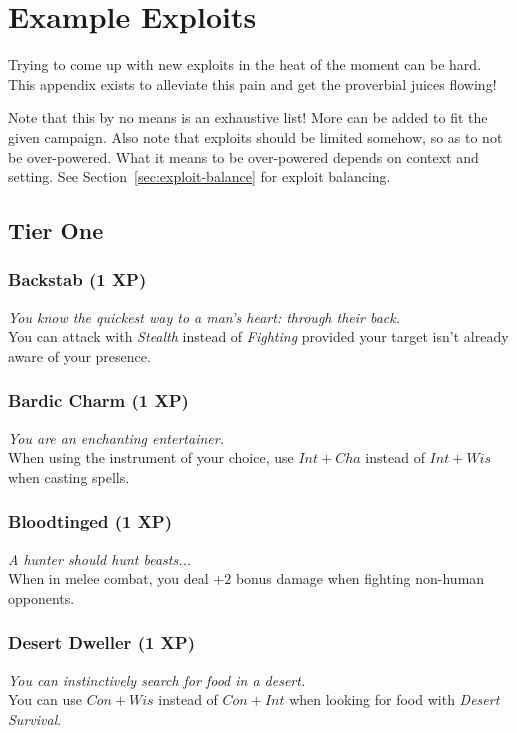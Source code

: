 \chapter{Example Exploits}\label{app:exploits}
Trying to come up with new exploits in the heat of the moment can be hard.
This appendix exists to alleviate this pain and get the proverbial juices flowing!

Note that this by no means is an exhaustive list!
More can be added to fit the given campaign.
Also note that exploits should be limited somehow, so as to not be over-powered. What it means to be over-powered depends on context and setting. See Section~\ref{sec:exploit-balance} for exploit balancing.

\section{Tier One}

\subsection{Backstab (1 XP)}
\textit{You know the quickest way to a man's heart: through their back.}\\
You can attack with \textit{Stealth} instead of \textit{Fighting} provided your target isn't already aware of your presence.

\subsection{Bardic Charm (1 XP)}
\textit{You are an enchanting entertainer.}\\
When using the instrument of your choice, use $Int+Cha$ instead of $Int+Wis$ when casting spells.

\subsection{Bloodtinged (1 XP)}
\textit{A hunter should hunt beasts...}\\
When in melee combat, you deal $+2$ bonus damage when fighting non-human opponents.

\subsection{Desert Dweller (1 XP)}
\textit{You can instinctively search for food in a desert.}\\
You can use $Con + Wis$ instead of $Con + Int$ when looking for food with \textit{Desert Survival}.

